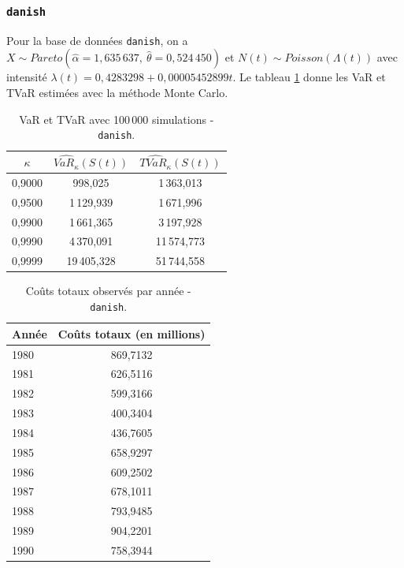 		\subsubsection{\texttt{danish}}
		Pour la base de données \texttt{danish}, on a $X \sim Pareto(\hat{\alpha} = 1,635\,637,\: \hat{\theta}=0,524\,450)$ et $N(t) \sim Poisson(\Lambda(t))$ avec intensité $\lambda(t) = 0,4283298 + 0,00005452899 t$. Le tableau \ref{TAB_TVAR_Dan} donne les VaR et TVaR estimées avec la méthode Monte Carlo.
		
		\begin{table}[H]
			\begin{center}
				\begin{tabular}{|c|c|c|}
					\hline
					$\kappa$ & $\widehat{VaR_{\kappa}}(S(t))$ & $\widehat{TVaR_{\kappa}}(S(t))$ \\ \hline
					0,9000   &           998,025           &          1\,363,013          \\
					0,9500   &         1\,129,939          &          1\,671,996          \\
					0,9900   &         1\,661,365          &          3\,197,928          \\
					0,9990   &         4\,370,091          &         11\,574,773          \\
					0,9999   &         19\,405,328         &         51\,744,558          \\ \hline
				\end{tabular}
				\renewcommand{\tablename}{Tableau}
				\caption{VaR et TVaR avec 100\,000 simulations - \texttt{danish}.}\label{TAB_TVAR_Dan}	
			\end{center}
		\end{table}
	
		\begin{table}[H]
			\begin{center}
				\begin{tabular}{|l|c|}
					\hline
					Année & Coûts totaux (en millions) \\ \hline
					1980  &          869,7132          \\
					1981  &          626,5116          \\
					1982  &          599,3166          \\
					1983  &          400,3404          \\
					1984  &          436,7605          \\
					1985  &          658,9297          \\
					1986  &          609,2502          \\
					1987  &          678,1011          \\
					1988  &          793,9485          \\
					1989  &          904,2201          \\
					1990  &          758,3944          \\ \hline
				\end{tabular}
				\renewcommand{\tablename}{Tableau}
				\caption{Coûts totaux observés par année - \texttt{danish}.}\label{TAB_COUT_OBS_Dan}	
			\end{center}
		\end{table}
	
